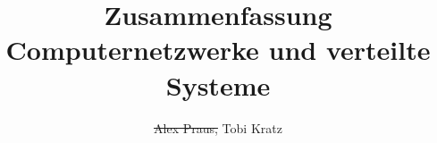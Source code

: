 \documentclass[
	ngerman,
	accentcolor=9c,%
	type=intern,
	marginpar=false
	]{tudapub}
\begin{document}
\title{Zusammenfassung Computernetzwerke und verteilte Systeme}
\author{\sout{Alex Praus,} Tobi Kratz}

\maketitle

\tableofcontents












\end{document}
